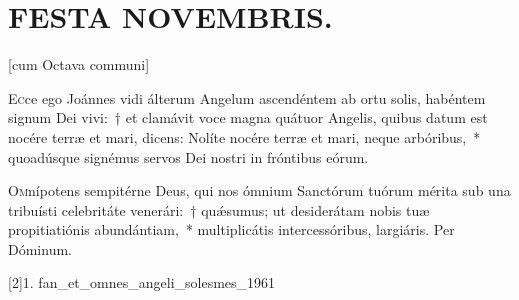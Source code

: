 \documentclass[vesperale_romanum]{subfiles}
\begin{document}
\section[Festa Novembris]{FESTA NOVEMBRIS.}
\label{1_novembris}



[cum Octava communi]



%



\lettrine{E}{c}ce ego Joánnes vidi álterum Angelum ascendéntem ab ortu solis, habéntem signum Dei vivi:~† et clamávit voce magna quátuor Angelis, quibus datum est nocére terræ et mari, dicens: Nolíte nocére terræ et mari, neque arbóribus,~* quoadúsque signémus servos Dei nostri in fróntibus eórum.





\oratio

\lettrine{O}{m}nípotens sempitérne Deus, qui nos ó\-mnium Sanctórum tuórum mérita sub una tribuísti celebritáte venerári:~† quǽsumus; ut desiderátam nobis tuæ propitiatiónis abundántiam,~* multiplicátis intercessóribus, largiáris. Per Dóminum.



[2]{1. f}{an_et_omnes_angeli_solesmes_1961}
\end{document}
